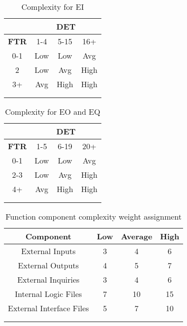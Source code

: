 \begin{longtable}{cccc}
\toprule
\multicolumn{1}{c}{} & 
\multicolumn{3}{c}{\textbf{DET}}\\
\midrule
\textbf{FTR} & 1-4 & 5-15 & 16+ \\
\midrule
0-1	&	Low	&	Low		&	Avg \\
2	&	Low	&	Avg		&	High \\
3+	&	Avg	&	High	&	High\\
\bottomrule \\
\caption{Complexity for EI}
\label{tbl:complexityEI}
\end{longtable}

\clearpage

\begin{longtable}{cccc}
\toprule
\multicolumn{1}{c}{} & 
\multicolumn{3}{c}{\textbf{DET}}\\
\midrule
\textbf{FTR} & 1-5 & 6-19 & 20+ \\
\midrule
0-1	&	Low	&	Low		&	Avg \\
2-3	&	Low	&	Avg		&	High \\
4+	&	Avg	&	High	&	High\\
\bottomrule \\
\caption{Complexity for EO and EQ}
\label{tbl:complexityEO_EQ}
\end{longtable}



\begin{longtable}{cccc}
\toprule
Component				&	Low	&	Average	&	High \\
\midrule
External Inputs			&	3	&	4		&	6 \\
External Outputs		&	4	&	5		&	7 \\
External Inquiries		&	3	&	4		&	6 \\
Internal Logic Files	&	7	&	10		&	15 \\
External Interface Files&	5	&	7		&	10 \\
\bottomrule \\
\caption{Function component complexity weight assignment}
\label{tbl:complexityWeight}
\end{longtable}

